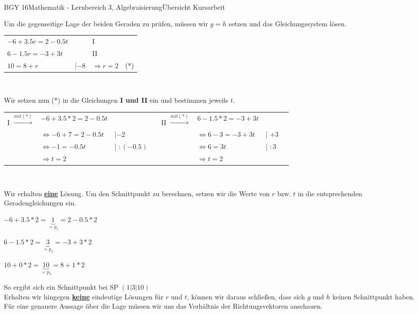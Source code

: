 \documentclass[oneside,openany,headings=optiontotoc,11pt,numbers=noenddot]{scrreprt}
\begin{document}
\begin{worksheet}{BGY 16}{Mathematik - Lernbereich 3, Algebraisierung}{Übersicht Kursarbeit}
\begin{framed}
			\par\noindent
			Um die gegenseitige Lage der beiden Geraden zu prüfen, müssen wir \(g=h\) setzen und das Gleichungssystem lösen.\\
			\begin{tabularx}{\textwidth}{llll}
				\(-6 +3.5r = 2 -0.5t\) & & I\\
				\(6 -1.5r = -3 +3t\) & & II\\
				\(10 = 8 +r\) & |\(-8\) & \(\Rightarrow r= 2\) & (*)\\
			\end{tabularx}\\
			\par\noindent
			Wir setzen nun (*) in die Gleichungen \textbf{I und II} ein und bestimmen jeweils \(t\).\\
			\par\noindent
			\begin{tabularx}{\textwidth}{lXll|lXll}
				I \(\xrightarrow{mit (*)}\) & \( -6+3.5*2 = 2-0.5t\) & & & II \(\xrightarrow{mit (*)}\) & \(6 -1.5*2 = -3 +3t\)\\
				&\(\Leftrightarrow -6+7 = 2-0.5t\) & |\(-2\) & & & \(\Leftrightarrow 6-3 = -3 +3t\) & | \(+3\)\\
				&\(\Leftrightarrow -1 = -0.5t\) & | \(:(-0.5)\) & & & \(\Leftrightarrow 6 = 3t\) & | \(:3\)\\
				&\(\Rightarrow t = 2\) & & & & \(\Rightarrow t = 2\)\\				
			\end{tabularx}\\
			\par\noindent
			Wir erhalten \underline{\textbf{eine}} Lösung. Um \color{codegreen}den\normalcolor{} Schnittpunkt zu berechnen, setzen wir die Werte von \(r\) bzw. \(t\) in die entsprechenden Geradengleichungen ein.\\
			\begin{center}
				\(-6 + 3.5*2= \underbrace{1}_{= p_1} = 2 - 0.5*2 \)\\
				\par\bigskip
				\(6 - 1.5*2 = \underbrace{3}_{= p_2} = -3 + 3*2\)\\
				\par\bigskip
				\(10 + 0*2 = \underbrace{10}_{= p_3} = 8+1*2\)\\
			\end{center}
			So ergibt sich ein Schnittpunkt bei SP \((1|3|10)\)\\
			Erhalten wir hingegen \underline{\textbf{keine}} eindeutige Lösungen für \(r\) und \(t\), können wir daraus schließen, dass sich \(g\) und \(h\) \color{red}keinen\normalcolor{} Schnittpunkt haben. Für eine genauere Aussage über die Lage müssen wir uns das Verhältnis der Richtungsvektoren anschauen.\\

\end{framed}
\end{worksheet}
\end{document}
